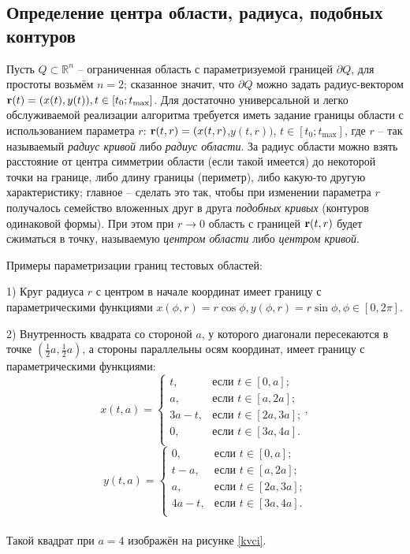 \documentclass[a4paper]{article}
\newcommand{\R}[1]{\mathbb{R}^#1}
\begin{document}
\subsection{Определение центра области, радиуса, подобных контуров}
Пусть $Q \subset \R{n} $ -- ограниченная область с параметризуемой границей $\partial Q$, для простоты возьмём $n=2$;
сказанное значит, что $\partial Q$ можно задать радиус-вектором ${\bf r}(t)=(x(t),y(t)), t \in [t_0;t_{\max}]$.
Для достаточно универсальной и легко обслуживаемой реализации алгоритма требуется иметь задание границы области с использованием параметра $r$: ${\bf r}(t,r)=(x(t,r)$,$y(t,r))$, $t \in [t_0;t_{\max}]$, где $r$ -- так называемый {\it радиус кривой} либо {\it радиус области}.
За радиус области можно взять расстояние от центра симметрии области (если такой имеется) до некоторой точки на границе, либо длину границы (периметр), либо какую-то другую характеристику;
главное -- сделать это так, чтобы при изменении параметра $r$ получалось семейство вложенных друг в друга {\it подобных кривых} (контуров одинаковой формы). При этом при $r \rightarrow 0$ область с границей ${\bf r}(t,r)$ будет сжиматься в точку, называемую {\it центром области} либо {\it центром кривой}.

Примеры параметризации границ тестовых областей:

  1) Круг радиуса $r$ с центром в начале координат имеет границу с параметрическими функциями $x(\phi, r)=r \cos \phi, y(\phi, r)=r \sin \phi, \phi \in [0, 2\pi]$.
  
  2) Внутренность квадрата со стороной $a$, у которого диагонали пересекаются в точке $(\frac{1}{2}a,\frac{1}{2}a)$, а стороны параллельны осям координат, имеет границу с параметрическими функциями:
        \[
          x(t,a) =
          \begin{cases}
            t,    & \text{если $t \in [0,a]$;}   \\
            a,    & \text{если $t \in [a,2a]$;}  \\
            3a-t, & \text{если $t \in [2a,3a]$;} \\
            0,    & \text{если $t \in [3a,4a]$.} \\
          \end{cases},
        \]
        \[
          y(t,a) =
          \begin{cases}
            0,    & \text{если $t \in [0,a]$;}   \\
            t-a,  & \text{если $t \in [a,2a]$;}  \\
            a,    & \text{если $t \in [2a,3a]$;} \\
            4a-t, & \text{если $t \in [3a,4a]$.} \\
          \end{cases}
        \]
        \\
        Такой квадрат при $a=4$ изображён на рисунке \ref{kvci}.
\end{document}
